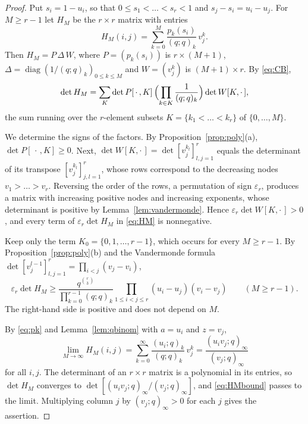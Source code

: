 \documentclass{amsart}
\theoremstyle{remark}
\numberwithin{equation}{section}
\begin{document}
\begin{proof}
Put $s_i=1-u_i$, so that $0\le s_1<\dots<s_r<1$ and $s_j-s_i=u_i-u_j$. For $M\ge r-1$ let $H_M$ be the $r\times r$ matrix with entries
\[
H_M(i,j)=\sum_{k=0}^{M}\frac{p_k(s_i)}{(q;q)_k}\,v_j^k .
\]
Then $H_M=P\,\Delta\,W$, where $P=(p_k(s_i))$ is $r\times(M+1)$, $\Delta=\operatorname{diag}(1/(q;q)_k)_{0\le k\le M}$ and $W=(v_j^k)$ is $(M+1)\times r$. By \eqref{eq:CB},
\begin{equation}\label{eq:HM}
\det H_M=\sum_{K}\det P[\,\cdot\,,K]\,\Bigl(\prod_{k\in K}\frac{1}{(q;q)_k}\Bigr)\det W[K,\cdot\,],
\end{equation}
the sum running over the $r$-element subsets $K=\{k_1<\dots<k_r\}$ of $\{0,\dots,M\}$.

We determine the signs of the factors. By Proposition~\ref{prop:poly}(a), $\det P[\,\cdot\,,K]\ge0$. Next, $\det W[K,\cdot\,]=\det[v_j^{k_l}]_{l,j=1}^r$ equals the determinant of its transpose $[v_j^{k_l}]_{j,l=1}^r$, whose rows correspond to the decreasing nodes $v_1>\dots>v_r$. Reversing the order of the rows, a permutation of sign $\varepsilon_r$, produces a matrix with increasing positive nodes and increasing exponents, whose determinant is positive by Lemma~\ref{lem:vandermonde}. Hence $\varepsilon_r\det W[K,\cdot\,]>0$, and every term of $\varepsilon_r\det H_M$ in \eqref{eq:HM} is nonnegative.

Keep only the term $K_0=\{0,1,\dots,r-1\}$, which occurs for every $M\ge r-1$. By Proposition~\ref{prop:poly}(b) and the Vandermonde formula $\det[v_j^{l-1}]_{l,j=1}^r=\prod_{i<j}(v_j-v_i)$,
\begin{equation}\label{eq:HMbound}
\varepsilon_r\det H_M\ge\frac{q^{\binom r3}}{\prod_{k=0}^{r-1}(q;q)_k}\prod_{1\le i<j\le r}(u_i-u_j)(v_i-v_j)
\qquad(M\ge r-1).
\end{equation}
The right-hand side is positive and does not depend on $M$.

By \eqref{eq:pk} and Lemma~\ref{lem:qbinom} with $a=u_i$ and $z=v_j$,
\[
\lim_{M\to\infty}H_M(i,j)=\sum_{k=0}^\infty\frac{(u_i;q)_k}{(q;q)_k}\,v_j^k=\frac{(u_iv_j;q)_\infty}{(v_j;q)_\infty}
\]
for all $i,j$. The determinant of an $r\times r$ matrix is a polynomial in its entries, so $\det H_M$ converges to $\det[(u_iv_j;q)_\infty/(v_j;q)_\infty]$, and \eqref{eq:HMbound} passes to the limit. Multiplying column $j$ by $(v_j;q)_\infty>0$ for each $j$ gives the assertion.
\end{proof}
\end{document}
